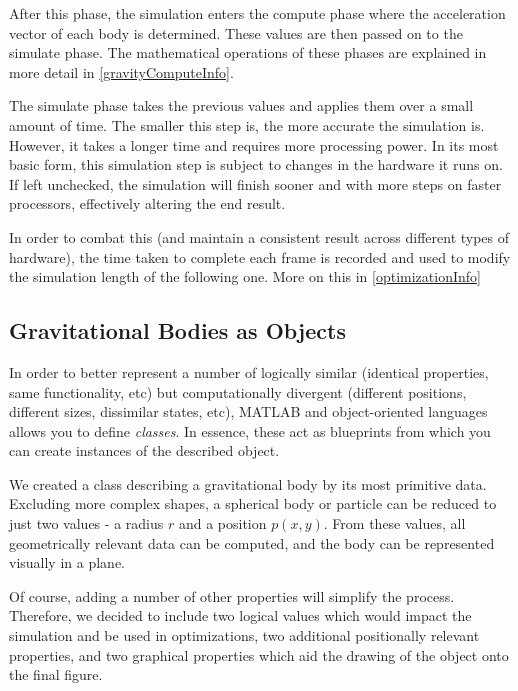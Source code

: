 \documentclass[11pt]{article}
\begin{document}
After this phase, the simulation enters the compute phase where the acceleration vector of each body is determined. These values are then passed on to the simulate phase. The mathematical operations of these phases are  explained in more detail in \ref{gravityComputeInfo}.

The simulate phase takes the previous values and applies them over a small amount of time. The smaller this step is, the more accurate the simulation is. However, it takes a longer time and requires more processing power. In its most basic form, this simulation step is subject to changes in the hardware it runs on. If left unchecked, the simulation will finish sooner and with more steps on faster processors, effectively altering the end result. 

In order to combat this (and maintain a consistent result across different types of hardware), the time taken to complete each frame is recorded and used to modify the simulation length of the following one. More on this in \ref{optimizationInfo}

\subsection{Gravitational Bodies as Objects}
In order to better represent a number of logically similar (identical properties, same functionality, etc) but computationally divergent (different positions, different sizes, dissimilar states, etc), MATLAB and object-oriented languages allows you to define \emph{classes}. In essence, these act as blueprints from which you can create instances of the described object.

We created a class describing a gravitational body by its most primitive data. Excluding more complex shapes, a spherical body or particle can be reduced to just two values - a radius $r$ and a position $p(x, y)$. From these values, all geometrically relevant data can be computed, and the body can be represented visually in a plane.

Of course, adding a number of other properties will simplify the process. Therefore, we decided to include two logical values which would impact the simulation and be used in optimizations, two additional positionally relevant properties, and two graphical properties which aid the drawing of the object onto the final figure.
\end{document}
